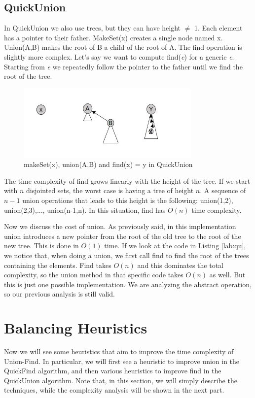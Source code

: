 \documentclass{article}
\begin{document}
\subsection{QuickUnion} \label{QU}
In QuickUnion we also use trees, but they can have height $\neq$ 1. Each element has a pointer to their
father. MakeSet(x) creates a single node named x. Union(A,B) makes the root of B a child of the 
root of A. The find operation is slightly more complex. Let's say
we want to compute find(\emph{e}) for a generic \emph{e}. Starting from \emph{e} we repeatedly 
follow the pointer to the father until we find the root of the tree.
\begin{figure}[h!]
    \centering
    \includegraphics[width=0.8\textwidth]  {img/uf.jpg}
    \caption{makeSet(x), union(A,B) and find(x) = y in QuickUnion}
    \label{fig:quickUnion}
\end{figure}

The time complexity of find grows linearly with the height of the tree. 
If we start with $n$ disjointed sets, the worst case is having a tree of height $n$. A sequence
of $n-1$ union operations that leads to this height is the following: union(1,2), union(2,3),..., union(n-1,n).
In this situation, find has $O(n)$ time complexity. 
\begin{center}
     
\end{center}
Now we discuss the cost of union. As previously said, in this implementation
union introduces a new pointer from the root of the old tree to the root of the new tree. This is 
done in $O(1)$ time. If we look at the code in Listing \ref{lab:qu}, we notice
that, when doing a union, we first call find to find the root of the trees containing the elements. Find takes $O(n)$ and this dominates the 
total complexity, so the union method in that specific code takes $ O(n)$ as well. But this is just one possible implementation. We are analyzing
the abstract operation, so our previous analysis is still valid. 

\section{Balancing Heuristics}
Now we will see some heuristics that aim to improve the time complexity of Union-Find. In particular,
we will first see a heuristic to improve union in the QuickFind algorithm, and then various heuristics to improve
find in the QuickUnion algorithm. Note that, in this section, we will simply describe the techniques, while the 
complexity analysis will be shown in the next part.
\end{document}
